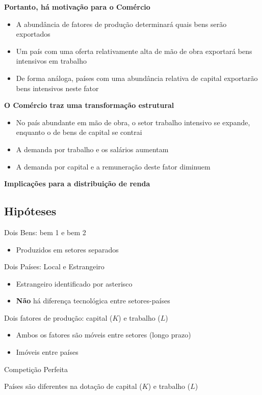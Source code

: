 \documentclass[a4paper,12pt]{article}[abntex2]
\begin{document}
\textbf{Portanto,  há  motivação  para  o  Comércio}\begin{itemize}
    \item A abundância de fatores de produção determinará quais bens serão exportados
    \item Um país com uma oferta relativamente alta de mão de obra exportará bens intensivos em trabalho
    \item De forma análoga, países com uma abundância relativa de capital exportarão bens intensivos neste fator
\end{itemize}

\textbf{O  Comércio  traz  uma  transformação  estrutural}\begin{itemize}
    \item No país abundante em mão de obra, o setor trabalho intensivo se expande, enquanto o de bens de capital se contrai
    \item A demanda por trabalho e os salários aumentam
    \item A demanda por capital e a remuneração deste fator diminuem 
\end{itemize}

\textbf{Implicações  para  a  distribuição  de  renda}

\subsection{\textbf{Hipóteses}}
Dois Bens: bem 1 e bem 2   \begin{itemize}
    \item Produzidos em setores separados
\end{itemize}

Dois Países: Local e Estrangeiro\begin{itemize}
    \item Estrangeiro identificado por asterisco
    \item \textbf{Não} há diferença tecnológica entre setores-países
\end{itemize}

Dois fatores de produção: capital (\(K\)) e trabalho (\(L\))\begin{itemize}
    \item Ambos os fatores são móveis entre setores (longo prazo)
    \item Imóveis entre países
\end{itemize}

Competição Perfeita

Países são diferentes na dotação de capital (\(K\)) e trabalho (\(L\))
\end{document}
